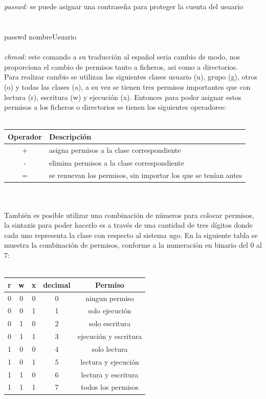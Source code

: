 \documentclass[10pt,a4paper,titlepage]{article}
\begin{document}
	\\
	\\
	\emph{passwd:} se puede asignar una contraseña para proteger la cuenta del usuario \\
	\\
	\\
	passwd nombreUsuario
	\\
	\\
	\emph{chmod:} este comando a su traducción al español seria cambio de modo, nos proporciona el cambio de permisos tanto a ficheros, asi como a directorios.
	\\
	Para realizar cambio se utilizan las siguientes clases usuario (u), grupo (g), otros (o) y todas las clases (a), a su vez se tienen tres permisos importantes que con lectura (r), escritura (w) y ejecución (x). Entonces para poder asignar estos permisos a los ficheros o directorios se tienen los siguientes operadores:
	\\
	\\
	\begin{tabular}{|c|p{8cm}|}
		\hline
		Operador & Descripción \\
		\hline
		+ & asigna permisos a la clase correspondiente \\
		\hline
		- & elimina permisos a la clase correspondiente \\
		\hline
		= & se renuevan los permisos, sin importar los que se tenían antes \\
		\hline
	\end{tabular}
	\\
	\\
	También es posible utilizar una combinación de números para colocar permisos, la sintaxis para poder hacerlo es a través de una cantidad de tres dígitos donde cada uno representa la clase con respecto al sistema ugo. En la siguiente tabla se muestra la combinación de permisos, conforme a la numeración en binario del 0 al 7:
	\\
	\\
	\begin{tabular}{|c|c|c|c|c|}
		\hline
		r & w & x & decimal & Permiso \\
		\hline
		0 & 0 & 0 & 0 & ningun permiso \\
		\hline
		0 & 0 & 1 & 1 & solo ejecución \\
		\hline
		0 & 1 & 0 & 2 & solo escritura \\
		\hline
		0 & 1 & 1 & 3 & ejecución y escritura \\
		\hline
		1 & 0 & 0 & 4 & solo lectura \\
		\hline
		1 & 0 & 1 & 5 & lectura y ejecución \\
		\hline
		1 & 1 & 0 & 6 & lectura y escritura \\
		\hline
		1 & 1 & 1 & 7 & todos los permisos \\
		\hline
	\end{tabular}
\end{document}
